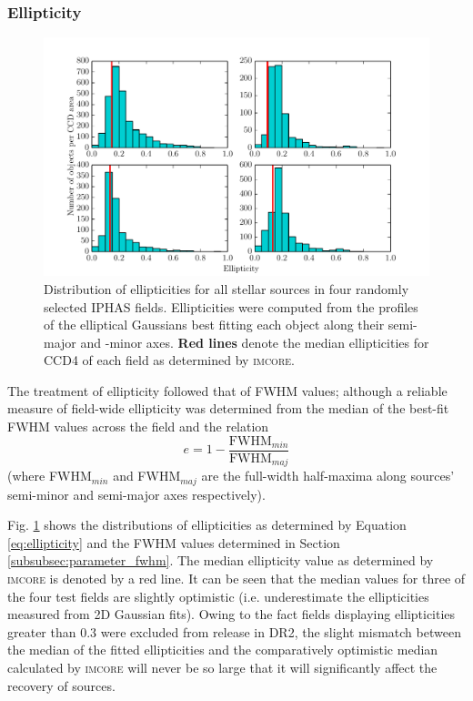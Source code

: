 \documentclass[a4paper,useAMS,usenatbib]{mn2e}
\begin{document}
\subsubsection{Ellipticity}
\label{subsubsec:ellipticity}
\begin{figure} 
\begin{center}
\includegraphics[width=1.0\linewidth]{figures/parameter_ell.pdf}
\caption{\footnotesize Distribution of ellipticities for all stellar sources in
four randomly selected IPHAS fields. Ellipticities were computed from the
profiles of the elliptical Gaussians best fitting each object along their semi-
major and -minor axes. \textbf{Red lines} denote the median ellipticities for
CCD4 of each field as determined by \textsc{imcore.}} 
\label{fig:parameter_ell}
\end{center} 
\end{figure}

The treatment of ellipticity followed that of FWHM values; although a reliable measure of field-wide ellipticity was determined from the median of the best-fit FWHM values across the field and the relation
\begin{equation}
e=1-\frac{\mathrm{FWHM}_{min}}{\mathrm{FWHM}_{maj}}
\label{eq:ellipticity}
\end{equation}
\noindent (where FWHM$_{min}$ and FWHM$_{maj}$ are the full-width half-maxima along sources' semi-minor and semi-major axes respectively).

Fig. \ref{fig:parameter_ell} shows the distributions of ellipticities as
determined by Equation \ref{eq:ellipticity} and the FWHM values determined in
Section \ref{subsubsec:parameter_fwhm}. The median ellipticity value as
determined by \textsc{imcore} is denoted by a red line. It can be seen that the
median values for three of the four test fields are slightly optimistic (i.e.
underestimate the ellipticities measured from 2D Gaussian fits). Owing to the
fact fields displaying ellipticities greater than 0.3 were excluded from release in DR2, the slight mismatch between the median of the fitted ellipticities and the comparatively optimistic median calculated by \textsc{imcore} will never be so large that it will significantly affect the recovery of sources.
\end{document}
